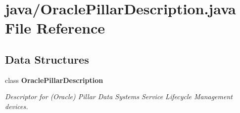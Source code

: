 \section{java/\+Oracle\+Pillar\+Description.java File Reference}
\label{OraclePillarDescription_8java}
\subsection*{Data Structures}
\begin{DoxyCompactItemize}
\item 
class {\bf Oracle\+Pillar\+Description}
\begin{DoxyCompactList}\small\item\em Descriptor for (Oracle) Pillar Data Systems\textquotesingle{} Service Lifecycle Management devices. \end{DoxyCompactList}\end{DoxyCompactItemize}
